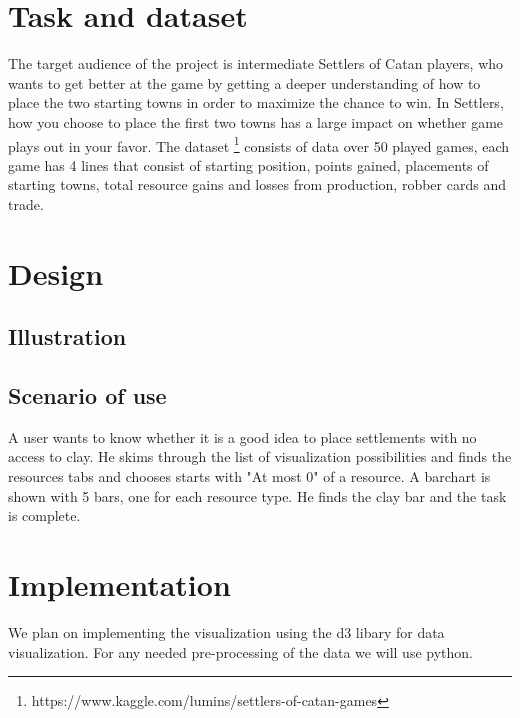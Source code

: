 \documentclass{article}
\begin{document}
\section{Task and dataset}

The target audience of the project is intermediate Settlers of Catan
players, who wants to get better at the game by getting a deeper understanding
of how to place the two starting towns in order to maximize the chance
to win. In Settlers, how you choose to place the first two towns has
a large impact on whether game plays out in your favor. The dataset
\footnote{https://www.kaggle.com/lumins/settlers-of-catan-games} consists of
data over 50 played games, each game has 4 lines that consist of starting
position, points gained, placements of starting towns, total resource gains
and losses from production, robber cards and trade.

\section{Design}

\subsection{Illustration}



\subsection{Scenario of use}

A user wants to know whether it is a good idea to place settlements with no
access to clay. He skims through the list of visualization possibilities
and finds the resources tabs and chooses starts with "At most 0" of a
resource. A barchart is shown with 5 bars, one for each resource type. He
finds the clay bar and the task is complete.

\section{Implementation}
We plan on implementing the visualization using the d3 libary for data visualization.
For any needed pre-processing of the data we will use python.
\end{document}
